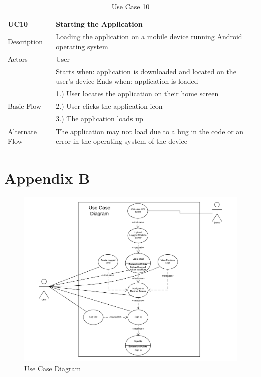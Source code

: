 \documentclass{article}
\begin{document}
\begin{appendicies}
\begin{table}[!htbp]
\centering
\hspace*{-0.5cm}
\begin{tabular}{||m{6cm}|m{6cm}||}
    \hline
    UC10 & Starting the Application\\
    \hline
    Description & Loading the application on a mobile device running Android operating system\\
    \hline
    Actors & User\\
    \hline
    & Starts when:  application is downloaded and located on the user’s device\newline
    Ends when: application is loaded\\
    \hline
    \multirow{3}{\hsize}{Basic Flow} 
                                    & 1.) User locates the application on their home screen\\
                                    & 2.) User clicks the application icon\\
                                    & 3.) The application loads up\\
    \hline
    Alternate Flow & The application may not load due to a bug in the code or an error in the operating system of the device\\
\hline
\end{tabular}
\caption{Use Case 10}
\label{table:UC10}
\end{table}

\newpage
\section{Appendix B}
\begin{figure}[h]
    \centering
    \hspace*{-3.5cm}
    \includegraphics[width = 18cm]{Use case diagram revised.png}
    \caption{Use Case Diagram}
    \label{fig:use_case_diagram}
\end{figure}


\end{appendicies}
\end{document}
